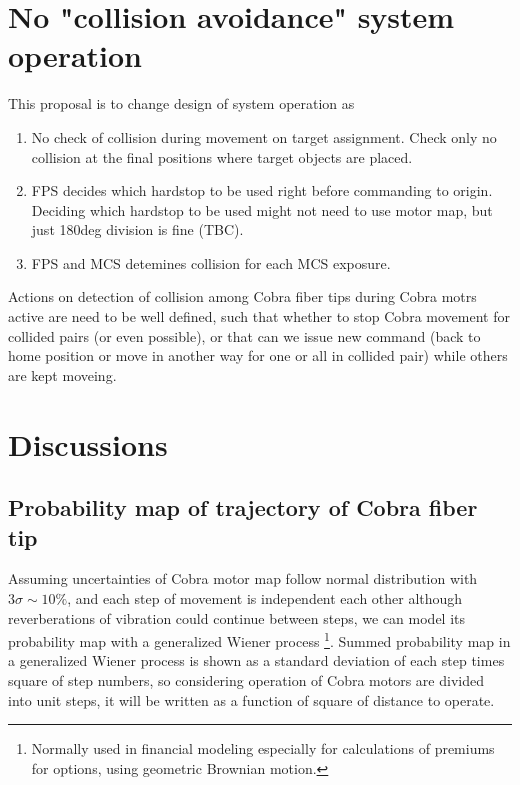 \documentclass[a4paper,notitlepage]{article}
\begin{document}
\section{No "collision avoidance" system operation}

This proposal is to change design of system operation as

\begin{enumerate}
  \item No check of collision during movement on target assignment.
    Check only no collision at the final positions where target objects are 
    placed.
  \item FPS decides which hardstop to be used right before commanding to origin.
    Deciding which hardstop to be used might not need to use motor map, but 
    just 180deg division is fine (TBC).
  \item FPS and MCS detemines collision for each MCS exposure.
\end{enumerate}

Actions on detection of collision among Cobra fiber tips during Cobra motrs 
active are need to be well defined, such that whether to stop Cobra movement 
for collided pairs (or even possible), or that can we issue new command (back 
to home position or move in another way for one or all in collided pair) 
while others are kept moveing. 

\section{Discussions}

\subsection{Probability map of trajectory of Cobra fiber tip}

Assuming uncertainties of Cobra motor map follow normal distribution with 
$3\sigma\sim 10\%$, and each step of movement is independent each other 
although reverberations of vibration could continue between steps, we can 
model its probability map with a generalized Wiener process
\footnote{Normally used in financial modeling especially for calculations of 
premiums for options, using geometric Brownian motion.}.
Summed probability map in a generalized Wiener process is shown as a standard 
deviation of each step times square of step numbers, so considering operation 
of Cobra motors are divided into unit steps, it will be written as a function 
of square of distance to operate. 
\end{document}
